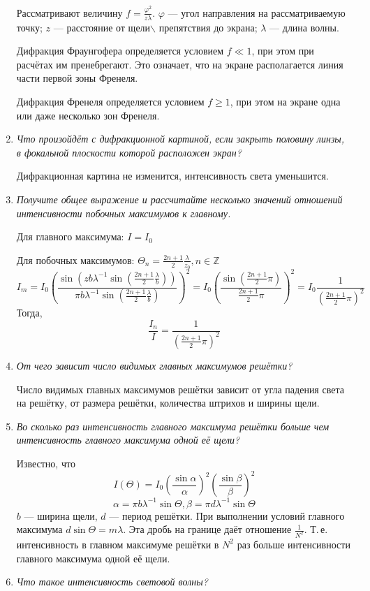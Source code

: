 \documentclass[a4paper,10pt,notitlepage,pdftex,headsepline]{scrartcl}
\begin{document}
\begin{enumerate}
Рассматривают величину $f = \frac{\varphi^2}{z \lambda}$.
$\varphi$ --- угол направления на рассматриваемую точку; $z$ --- расстояние от щели$\backslash$ препятствия до экрана; $\lambda$ --- длина волны.

Дифракция Фраунгофера определяется условием $f \ll 1$, при этом при расчётах им пренебрегают.
Это означает, что на экране располагается линия части первой зоны Френеля.

Дифракция Френеля определяется условием $f \geqslant 1$, при этом на экране одна или даже несколько зон Френеля.
\item \textit{Что произойдёт с дифракционной картиной, если закрыть половину линзы, в фокальной плоскости которой расположен экран?}

Дифракционная картина не изменится, интенсивность света уменьшится.
\item \textit{Получите общее выражение и рассчитайте несколько значений отношений интенсивности побочных максимумов к главному.}

Для главного максимума: $I = I_0$

Для побочных максимумов: $\Theta_n = \frac{2n + 1}{2} \frac{\lambda}{z_0}, n\in \mathbb{Z}$
$$I_m = I_0 \left(
\frac{\sin\left(z b \lambda^{-1} \sin\left(\frac{2n + 1}{2} \frac{\lambda}{b}\right)\right)}
{\pi b \lambda^{-1} \sin\left(\frac{2n + 1}{2} \frac{\lambda}{b}\right)}\right)^2 = I_0
\left(\frac{\sin\left(\frac{2n + 1}{2}\pi\right)}
{\frac{2n + 1}{2}\pi}\right)^2 = I_0 \frac{1}{\left(\frac{2n + 1}{2}\pi\right)^2}$$
Тогда, $$\frac{I_n}{I} = \frac{1}{\left(\frac{2n + 1}{2}\pi\right)^2}$$
\item \textit{От чего зависит число видимых главных максимумов решётки?}

Число видимых главных максимумов решётки зависит от угла падения света на решётку, от размера решётки, количества штрихов и ширины щели.
\item \textit{Во сколько раз интенсивность главного максимума решётки больше чем интенсивность главного максимума одной её щели?}

Известно, что
$$I\left(\Theta\right) = I_0\left(\frac{\sin\alpha}{\alpha}\right)^2 \left(\frac{\sin\beta}{\beta}\right)^2$$
$$\alpha = \pi b \lambda^{-1} \sin\Theta, \beta = \pi d \lambda^{-1}\sin\Theta$$
$b$ --- ширина щели, $d$ --- период решётки.
При выполнении условий главного максимума $d\sin\Theta = m\lambda$.
Эта дробь на границе даёт отношение $\frac{1}{N^2}$.
Т.\,е. интенсивность в главном максимуме решётки в $N^2$ раз больше интенсивности главного максимума одной её щели.
\item \textit{Что такое интенсивность световой волны?}


\end{enumerate}
\end{document}
